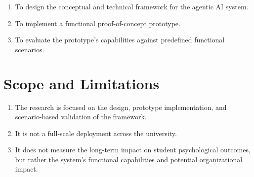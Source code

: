 \begin{enumerate}
    \item To design the conceptual and technical framework for the agentic AI system.
    \item To implement a functional proof-of-concept prototype.
    \item To evaluate the prototype's capabilities against predefined functional scenarios.
\end{enumerate}


\section{Scope and Limitations}
\label{sec:scope_and_limitations}

\begin{enumerate}
    \item The research is focused on the design, prototype implementation, and scenario-based validation of the framework.
    \item It is not a full-scale deployment across the university.
    \item It does not measure the long-term impact on student psychological outcomes, but rather the system's functional capabilities and potential organizational impact.
\end{enumerate}


